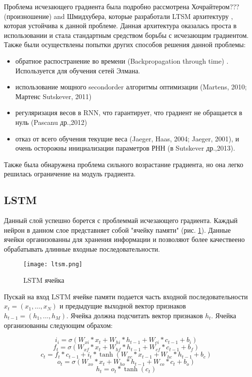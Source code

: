 Проблема исчезающего градиента была подробно рассмотрена Хочрайтером???(произношение) and Шмидхубера, которые разработали LTSM архитектуру \cite{create_lstm}, которая устойчива к данной проблеме. Данная архитектура оказалась проста в использовании и стала стандартным средством борьбы с исчезающим градиентом. Также были осуществлены попытки других способов решения данной проблемы:
\begin{itemize}
	\item обратное распостранение во времени (Backpropagation through time) \cite{Backpropagation}. Используется для обучения сетей Элмана.
	\item использование мощного secondorder алгоритмы оптимизации (Martens, 2010; Мартенс Sutskever, 2011)
	\item регуляризация весов в RNN, что гарантирует, что градиент не обращается в нуль (Pascanu др.,2012)
	\item отказ от всего обучения текущие веса (Jaeger, Haas, 2004; Jaeger, 2001), и очень
	осторожны инициализации параметров РНН (в Sutskever др.,2013).
\end{itemize}
	
Также была обнаружена проблема сильного возрастание градиента, но она легко решилась ограничение на модуль градиента.

\subsection{LSTM}

Данный слой успешно борется с проблеммай исчезающего градиента. Каждый нейрон в данном слое представняет собой "ячейку памяти" (рис. \ref{ris:ltsm}). Данные ячейки организованны для хранения информации и позволяют более качествеено обрабатывать длинные входные последовательности.

\begin{figure}[h]
\begin{center}
	\texttt{[image: ltsm.png]}
	\caption{LSTM ячейка}
	\label{ris:ltsm}
\end{center}
\end{figure}


Пускай на вход LSTM ячейке памяти подается часть входной последовательности $x_t = (x_1, ..., x_N)$ и предыдущие выходной вектор признаков $h_{t-1} = (h_1, ..., h_M)$. Ячейка должна подсчитать вектор признаков $h_t$. Ячейка организованны следующим обрахом:


\begin{equation}
	i_i = \sigma(W_{xi}*x_t+W_{hi}*h_{t-1}+W_{ci}*c_{t-1}+b_i)
\end{equation}
\begin{equation}
	f_t = \sigma(W_{xf}*x_t+W_{hf}*h_{t-1}+W_{cf}*c_{t-1}+b_f)
\end{equation}
\begin{equation}
	c_t = f_t*c_{t-1}+i_t*\tanh(W_{xc}*x_{t-1}+W_{hc}*h_{t-1}+b_c)
\end{equation}
\begin{equation}
	o_t = \sigma(W_{xo}*x_t+W_{ho}*h_{t-1}+W_{co}*c_t+b_o)
\end{equation}
\begin{equation}
	h_t = o_t*\tanh(c_t)
\end{equation}

